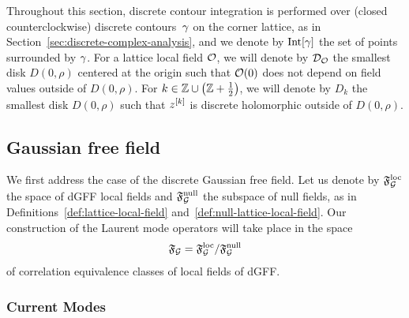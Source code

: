 \documentclass[12pt,oneside,english]{amsart}
\numberwithin{equation}{section}
\numberwithin{figure}{section}
\theoremstyle{plain}
\theoremstyle{plain}
\theoremstyle{plain}
\theoremstyle{plain}
\theoremstyle{remark}
\theoremstyle{definition}
\theoremstyle{plain}
\theoremstyle{plain}
\numberwithin{thm}{section}
\begin{document}
Throughout this section, discrete contour integration is performed over 
(closed counterclockwise) discrete contours~$\gamma$ 
on the corner lattice, as in Section~\ref{sec:discrete-complex-analysis},
and we denote by $\mathrm{Int}[{\gamma}]$ the set
of points surrounded by $\gamma$.
For a lattice local field ${\mathcal{O}}$,
we will denote by ${\mathcal{D}}_{{\mathcal{O}}}$ the smallest disk 
$D\left(0,\rho\right)$
centered at the origin such that ${\mathcal{O}}(0) $ does
not depend on field values outside of $D\left(0,\rho\right)$. For
$k\in\mathbb{Z} \cup\left(\mathbb{Z} +\frac{1}{2}\right)$, we will
denote by $D_{k}$ the smallest disk $D\left(0,\rho\right)$ such
that ${z^{[{k}]}}$ is discrete holomorphic outside of 
$D\left(0,\rho\right)$.


\subsection{Gaussian free field}

We first address the case of the discrete Gaussian free field.
Let us denote by
$\mathfrak{F}^\mathrm{loc}_{\mathcal{G}}$ the space of dGFF local fields and
$\mathfrak{F}^\mathrm{null}_{\mathcal{G}}$ the subspace of
null fields, as in Definitions~\ref{def:lattice-local-field}
and~\ref{def:null-lattice-local-field}. Our 
construction of the Laurent mode operators %
will take place in the space
\[ \mathfrak{F}_{\mathcal{G}} = 
\mathfrak{F}^\mathrm{loc}_{\mathcal{G}} / \mathfrak{F}^\mathrm{null}_{\mathcal{G}}\]
of correlation equivalence classes of local fields of dGFF.

\subsubsection{Current Modes}
\end{document}
